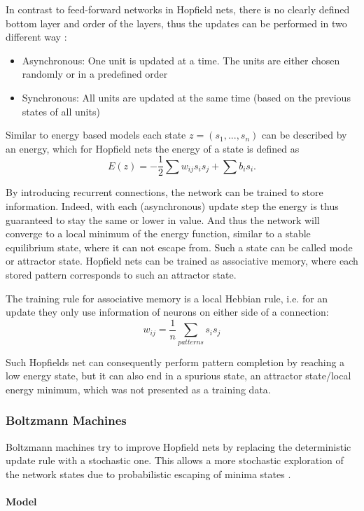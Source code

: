 In contrast to feed-forward networks in Hopfield nets, there is no clearly defined bottom layer and order of the layers, thus the updates can be performed in two different way :
\begin{itemize}
\item Asynchronous: One unit is updated at a time. The units are either chosen randomly or in a predefined order
\item Synchronous: All units are updated at the same time (based on the previous states of all units)
\end{itemize}

Similar to energy based models each state $z = (s_1, ... , s_n)$ can be described by an energy, which for Hopfield nets the energy of a state is defined as  
\[
E(z) = - \frac{1}{2} \sum w_{ij} s_i s_j + \sum b_i s_i .
\]


By introducing recurrent connections, the network can be trained to store information.
Indeed, with each (asynchronous) update step the energy is thus guaranteed to stay the same or lower in value.
And thus the network will converge to a local minimum of the energy function, similar to a stable equilibrium state, where it can not escape from. 
Such a state can be called mode or attractor state.
Hopfield nets can be trained as associative memory, where each stored pattern corresponds to such an attractor state.

The training rule for associative memory is a local Hebbian rule, i.e. for an update they only use information of neurons on either side of a connection:
\[
w_{ij} = \frac{1}{n} \sum_{patterns} s_{i} s_{j}
\]

Such Hopfields net can consequently perform pattern completion by reaching a low energy state, but it can also end in a spurious state, an attractor state/local energy minimum, which was not presented as a training data.


\subsubsection{Boltzmann Machines}

Boltzmann machines try to improve Hopfield nets by replacing the deterministic update rule with a stochastic one.
This allows a more stochastic exploration of the network states due to probabilistic escaping of minima states \cite{ackley1985learning} \cite{Goodfellow-et-al-2016-Book}.

\paragraph{Model}

